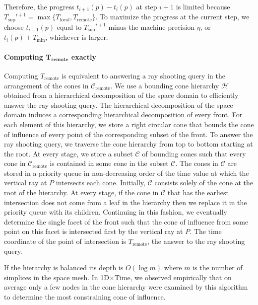 \documentclass[twocolumn]{article}
\def\minT{\ensuremath{T_{\text{min}}}}
\def\supT{\ensuremath{T_{\text{sup}}}}
\def\fp{\ensuremath{P}}
\begin{document}
Therefore, the progress $t_{i+1}(p) - t_i(p)$ at step $i+1$ is limited
because $\supT^{i+1} = \max \{T_{\text{local}}, T_{\text{remote}}\}$.
To maximize the progress at the current step, we choose $t_{i+1}(p)$
equal to $\supT^{i+1}$ minus the machine precision $\eta$, or $t_i(p)
+ \minT$, whichever is larger.

\paragraph{Computing $\mathbf{T_{\text{remote}}}$ exactly}

Computing $T_{\text{remote}}$ is equivalent to answering a ray
shooting query in the arrangement of the cones in
$\mathcal{C}_{\text{remote}}$.  We use a bounding cone hierarchy
$\mathcal{H}$ obtained from a hierarchical decomposition of the space
domain to efficiently answer the ray shooting query.  The hierarchical
decomposition of the space domain induces a corresponding hierarchical
decomposition of every front.  For each element of this hierarchy, we
store a right circular cone that bounds the cone of influence of every
point of the corresponding subset of the front.  To answer the ray
shooting query, we traverse the cone hierarchy from top to bottom
starting at the root.  At every stage, we store a subset $\mathcal{C}$
of bounding cones such that every cone in
$\mathcal{C}_{\text{remote}}$ is contained in some cone in the subset
$\mathcal{C}$.  The cones in $\mathcal{C}$ are stored in a priority
queue in non-decreasing order of the time value at which the vertical
ray at $\fp$ intersects each cone.  Initially, $\mathcal{C}$ consists
solely of the cone at the root of the hierarchy.  At every stage, if
the cone in $\mathcal{C}$ that has the earliest intersection does not
come from a leaf in the hierarchy then we replace it in the priority
queue with its children.  Continuing in this fashion, we eventually
determine the single facet of the front such that the cone of
influence from some point on this facet is intersected first by the
vertical ray at $\fp$.  The time coordinate of the point of
intersection is $T_{\text{remote}}$, the answer to the ray shooting
query.

If the hierarchy is balanced its depth is $O(\log m)$ where $m$ is the
number of simplices in the space mesh.  In 1D$\times$Time, we observed
empirically that on average only a few nodes in the cone hierarchy
were examined by this algorithm to determine the most constraining
cone of influence.
\end{document}
